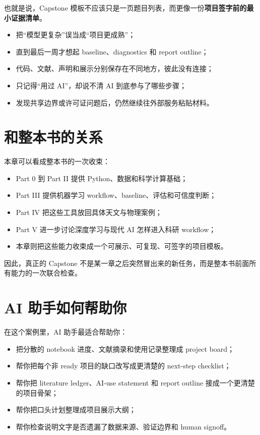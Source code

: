 也就是说，Capstone 模板不应该只是一页题目列表，而更像一份\textbf{项目签字前的最小证据清单}。

\begin{warnbox}
\begin{itemize}
    \item 把“模型更复杂”误当成“项目更成熟”；
    \item 直到最后一周才想起 baseline、diagnostics 和 report outline；
    \item 代码、文献、声明和展示分别保存在不同地方，彼此没有连接；
    \item 只记得“用过 AI”，却说不清 AI 到底参与了哪些步骤；
    \item 发现共享边界或许可证问题后，仍然继续往外部服务粘贴材料。
\end{itemize}
\end{warnbox}

\section{和整本书的关系}

本章可以看成整本书的一次收束：

\begin{itemize}
    \item Part 0 到 Part II 提供 Python、数据和科学计算基础；
    \item Part III 提供机器学习 workflow、baseline、评估和可信度判断；
    \item Part IV 把这些工具放回具体天文与物理案例；
    \item Part V 进一步讨论深度学习与现代 AI 怎样进入科研 workflow；
    \item 本章则把这些能力收束成一个可展示、可复现、可签字的项目模板。
\end{itemize}

因此，真正的 Capstone 不是某一章之后突然冒出来的新任务，而是整本书前面所有能力的一次联合检查。

\section{AI 助手如何帮助你}

在这个案例里，AI 助手最适合帮助你：

\begin{itemize}
    \item 把分散的 notebook 进度、文献摘录和使用记录整理成 project board；
    \item 帮你把每个非 ready 项目的缺口改写成更清楚的 next-step checklist；
    \item 帮你把 literature ledger、AI-use statement 和 report outline 接成一个更清楚的项目骨架；
    \item 帮你把口头计划整理成项目展示大纲；
    \item 帮你检查说明文字是否遗漏了数据来源、验证边界和 human signoff。
\end{itemize}

